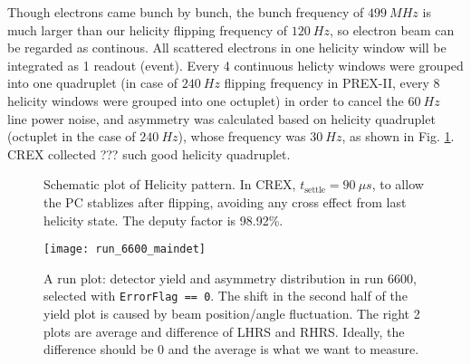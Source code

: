 Though electrons came bunch by bunch, the bunch frequency of $499\ MHz$ is much
larger than our helicity flipping frequency of $120\ Hz$, so electron beam can be regarded
as continous. All scattered electrons in one helicity window will be integrated as 1
readout (event). Every 4 continuous helicty windows were grouped into one quadruplet 
(in case of $240\ Hz$ flipping frequency in PREX-II, every 8 helicity windows 
were grouped into one octuplet)
in order to cancel the $60\ Hz$ line power noise, and asymmetry was
calculated based on helicity quadruplet (octuplet in the case of $240\ Hz$), 
whose frequency was $30\ Hz$, as shown in Fig. \ref{fig:helicity_pattern}. 
CREX collected ??? such good helicity quadruplet.
\begin{figure}[H]
    \centering
    \caption{Schematic plot of Helicity pattern. In CREX, $t_{\text{settle}} = 90\ \mu s$, 
    to allow the PC stablizes after flipping, avoiding any cross effect from last helicity state. 
    The deputy factor is 98.92\%.}
    \label{fig:helicity_pattern}
\end{figure}
\begin{figure}
    \centering
    \texttt{[image: run\_6600\_maindet]}
    \caption{A run plot: detector yield and asymmetry distribution in run 6600, 
    selected with \texttt{ErrorFlag == 0}. The shift in the second half of the 
    yield plot is caused by beam position/angle fluctuation. 
    The right 2 plots are average and difference of LHRS and RHRS. 
    Ideally, the difference should be 0 and the average is what we want to measure.
    }
\end{figure}


